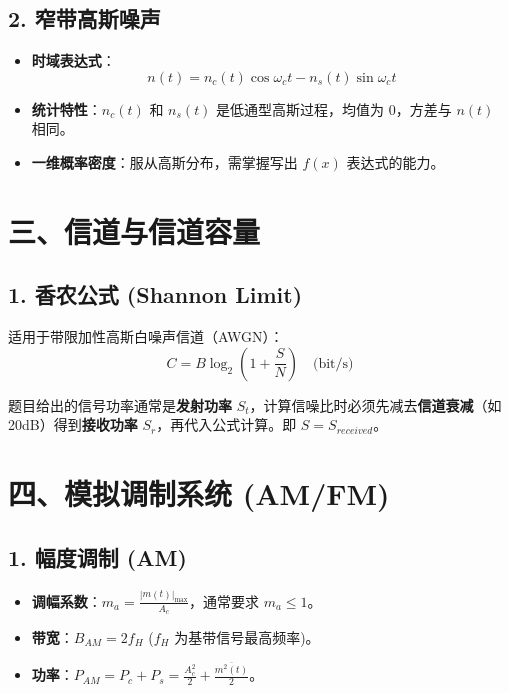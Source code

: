 \documentclass[12pt, a4paper]{article}
\begin{document}
	\subsection{2. 窄带高斯噪声}
	\begin{itemize}
		\item \textbf{时域表达式}：
		\[
		n(t) = n_c(t)\cos\omega_c t - n_s(t)\sin\omega_c t
		\]
		\item \textbf{统计特性}：$n_c(t)$ 和 $n_s(t)$ 是低通型高斯过程，均值为 0，方差与 $n(t)$ 相同。
		\item \textbf{一维概率密度}：服从高斯分布，需掌握写出 $f(x)$ 表达式的能力。
	\end{itemize}
	
	\section{三、信道与信道容量}
	\subsection{1. 香农公式 (Shannon Limit)}
	适用于带限加性高斯白噪声信道（AWGN）：
	\[
	C = B \log_2 (1 + \frac{S}{N}) \quad \text{(bit/s)}
	\]
	\begin{tcolorbox}[colback=red!5!white,colframe=red!75!black,title=考场陷阱]
		题目给出的信号功率通常是\textbf{发射功率} $S_t$，计算信噪比时必须先减去\textbf{信道衰减}（如 20dB）得到\textbf{接收功率} $S_r$，再代入公式计算。即 $S = S_{received}$。
	\end{tcolorbox}
	
	\section{四、模拟调制系统 (AM/FM)}
	\subsection{1. 幅度调制 (AM)}
	\begin{itemize}
		\item \textbf{调幅系数}：$m_a = \frac{|m(t)|_{\max}}{A_c}$，通常要求 $m_a \le 1$。
		\item \textbf{带宽}：$B_{AM} = 2f_H$ ($f_H$ 为基带信号最高频率)。
		\item \textbf{功率}：$P_{AM} = P_c + P_s = \frac{A_c^2}{2} + \frac{\overline{m^2(t)}}{2}$。
	\end{itemize}
	
\end{document}
